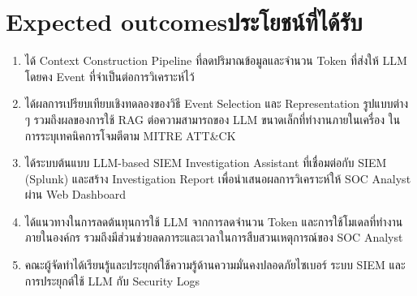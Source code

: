 
\section{\ifenglish Expected outcomes\else ประโยชน์ที่ได้รับ\fi}
\begin{enumerate}
    \item ได้ Context Construction Pipeline ที่ลดปริมาณข้อมูลและจำนวน Token ที่ส่งให้ LLM
          โดยคง Event ที่จำเป็นต่อการวิเคราะห์ไว้

    \item ได้ผลการเปรียบเทียบเชิงทดลองของวิธี Event Selection และ Representation รูปแบบต่าง ๆ
          รวมถึงผลของการใช้ RAG ต่อความสามารถของ LLM ขนาดเล็กที่ทำงานภายในเครื่อง
          ในการระบุเทคนิคการโจมตีตาม MITRE ATT\&CK

    \item ได้ระบบต้นแบบ LLM-based SIEM Investigation Assistant ที่เชื่อมต่อกับ SIEM (Splunk)
          และสร้าง Investigation Report เพื่อนำเสนอผลการวิเคราะห์ให้ SOC Analyst ผ่าน Web Dashboard

    \item ได้แนวทางในการลดต้นทุนการใช้ LLM จากการลดจำนวน Token และการใช้โมเดลที่ทำงานภายในองค์กร
          รวมถึงมีส่วนช่วยลดภาระและเวลาในการสืบสวนเหตุการณ์ของ SOC Analyst

    \item คณะผู้จัดทำได้เรียนรู้และประยุกต์ใช้ความรู้ด้านความมั่นคงปลอดภัยไซเบอร์ ระบบ SIEM
          และการประยุกต์ใช้ LLM กับ Security Logs
\end{enumerate}

